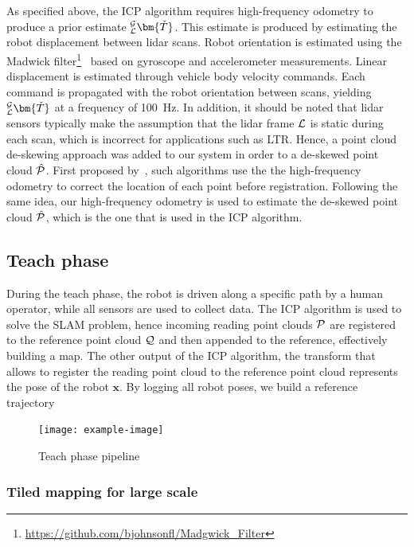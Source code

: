 As specified above, the \ac{ICP} algorithm requires high-frequency odometry to produce a prior estimate $_{\lidarf}^{\mapf}\bm{\check{T}}$.
This estimate is produced by estimating the robot displacement between lidar scans. 
Robot orientation is estimated using the Madwick filter\footnote{\url{https://github.com/bjohnsonfl/Madgwick_Filter}}~\citep{Madgwick2011} based on gyroscope and accelerometer measurements.
Linear displacement is estimated through vehicle body velocity commands.
Each command is propagated with the robot orientation between scans, yielding $_{\lidarf}^{\mapf}\bm{\check{T}}$ at a frequency of \SI{100}{Hz}.
In addition, it should be noted that lidar sensors typically make the assumption that the lidar frame $\mathcal{L}$ is static during each scan, which is incorrect for applications such as \ac{LTR}.
Hence, a point cloud de-skewing approach was added to our system in order to a de-skewed point cloud $\hat{\mathcal{P}}$.
First proposed by~\citet{Bosse2009}, such algorithms use the the high-frequency odometry to correct the location of each point before registration.
Following the same idea, our high-frequency odometry is used to estimate the de-skewed point cloud $\hat{\mathcal{P}}$, which is the one that is used in the \ac{ICP} algorithm.


\subsection{Teach phase}
\label{sec:teach_phase}

During the teach phase, the robot is driven along a specific path by a human operator, while all sensors are used to collect data.
The \ac{ICP} algorithm is used to solve the \ac{SLAM} problem, hence incoming reading point clouds $\mathcal{P}$ are registered to the reference point cloud $\mathcal{Q}$ and then appended to the reference, effectively building a map.
The other output of the \ac{ICP} algorithm, the transform that allows to register the reading point cloud to the reference point cloud \transform{\lidarf}{\mapf} represents the pose of the robot $\bm x$.
By logging all robot poses, we build a reference trajectory


\begin{figure} [htpb]
	\centering
	\texttt{[image: example-image]}
	\caption{Teach phase pipeline}
	\label{fig:teach_pipeline}
\end{figure}

\subsubsection{Tiled mapping for large scale}
\label{sec:tiled_map}
\lightlipsum[1]

